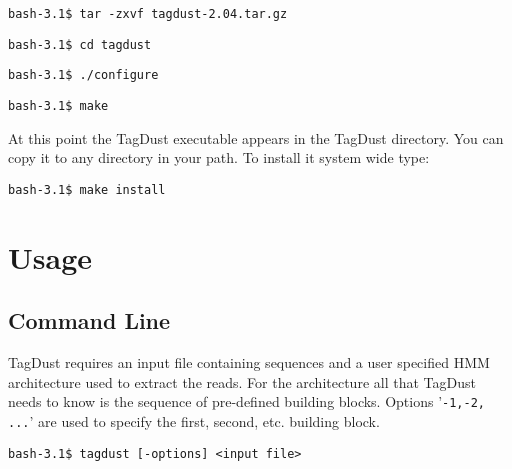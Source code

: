 \documentclass[11pt,a4paper,oneside]{book}
\begin{document}
\begin{verbatim}
bash-3.1$ tar -zxvf tagdust-2.04.tar.gz 
\end{verbatim}

\begin{verbatim}
bash-3.1$ cd tagdust
\end{verbatim}


\begin{verbatim}
bash-3.1$ ./configure
\end{verbatim}
\begin{verbatim}
bash-3.1$ make
\end{verbatim}
At this point the TagDust executable appears in the TagDust directory. You can copy it to any directory in your path. To install it system wide type:  
\begin{verbatim}
bash-3.1$ make install
\end{verbatim}
\chapter{Usage}

\section{Command Line}
TagDust requires an input file containing sequences and a user specified HMM architecture used to extract the reads. For the architecture all that TagDust needs to know is the sequence of pre-defined building blocks. Options '{\tt -1,-2, ...}' are used to specify the first, second, etc. building block.

\begin{verbatim}
bash-3.1$ tagdust [-options] <input file>  
\end{verbatim}

\end{document}
